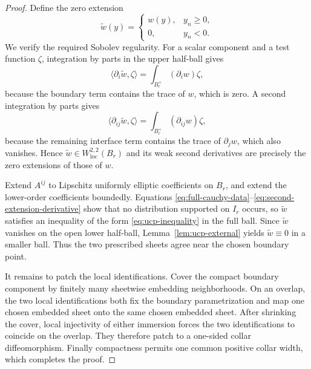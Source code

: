 \documentclass[10pt,a4paper]{amsart}
\begin{document}
\begin{proof}
Define the zero extension
\begin{equation}
        \widetilde w(y)=
        \begin{cases}
        w(y),&y_n\ge0,\\
        0,&y_n<0.
        \end{cases}
\end{equation}
We verify the required Sobolev regularity.  For a scalar component and a test
function $\zeta$, integration by parts in the upper half-ball gives
\begin{equation}
        \langle\partial_i\widetilde w,\zeta\rangle
        =\int_{B_r^+}(\partial_iw)\zeta,
\end{equation}
because the boundary term contains the trace of $w$, which is zero.  A second
integration by parts gives
\begin{equation}\label{eq:second-extension-derivative}
        \langle\partial_{ij}\widetilde w,\zeta\rangle
        =\int_{B_r^+}(\partial_{ij}w)\zeta,
\end{equation}
because the remaining interface term contains the trace of $\partial_jw$,
which also vanishes.  Hence $\widetilde w\in W^{2,2}_{\mathrm{loc}}(B_r)$ and
its weak second derivatives are precisely the zero extensions of those of
$w$.

Extend $A^{ij}$ to Lipschitz uniformly elliptic coefficients on $B_r$, and
extend the lower-order coefficients boundedly.  Equations
\eqref{eq:full-cauchy-data}--\eqref{eq:second-extension-derivative} show that
no distribution supported on $I_r$ occurs, so $\widetilde w$ satisfies an
inequality of the form \eqref{eq:ucp-inequality} in the full ball.  Since
$\widetilde w$ vanishes on the open lower half-ball,
Lemma~\ref{lem:ucp-external} yields $\widetilde w\equiv0$ in a smaller ball.
Thus the two prescribed sheets agree near the chosen boundary point.

It remains to patch the local identifications.  Cover the compact boundary
component by finitely many sheetwise embedding neighborhoods.  On an overlap,
the two local identifications both fix the boundary parametrization and map
one chosen embedded sheet onto the same chosen embedded sheet.  After
shrinking the cover, local injectivity of either immersion forces the two
identifications to coincide on the overlap.  They therefore patch to a
one-sided collar diffeomorphism.  Finally compactness permits one common positive
collar width, which completes the proof.
\end{proof}
\end{document}
